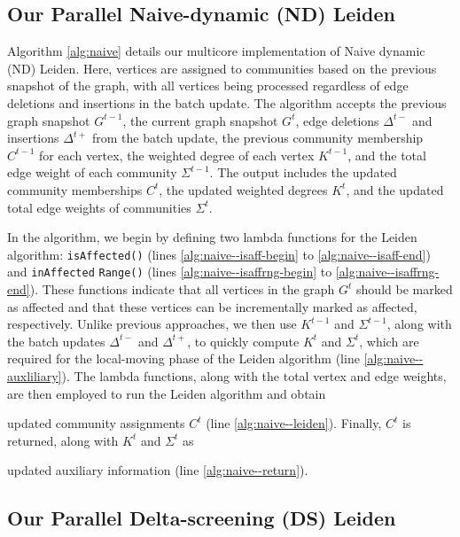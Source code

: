 \subsection{Our Parallel Naive-dynamic (ND) Leiden}
\label{sec:our-naive}

Algorithm \ref{alg:naive} details our multicore implementation of Naive dynamic (ND) Leiden. Here, vertices are assigned to communities based on the previous snapshot of the graph, with all vertices being processed regardless of edge deletions and insertions in the batch update. The algorithm accepts the previous graph snapshot $G^{t-1}$, the current graph snapshot $G^t$, edge deletions $\Delta^{t-}$ and insertions $\Delta^{t+}$ from the batch update, the previous community membership $C^{t-1}$ for each vertex, the weighted degree of each vertex $K^{t-1}$, and the total edge weight of each community $\Sigma^{t-1}$. The output includes the updated community memberships $C^t$, the updated weighted degrees $K^t$, and the updated total edge weights of communities $\Sigma^t$.

In the algorithm, we begin by defining two lambda functions for the Leiden algorithm: \texttt{isAffected()} (lines \ref{alg:naive--isaff-begin} to \ref{alg:naive--isaff-end}) and \texttt{inAffected} \texttt{Range()} (lines \ref{alg:naive--isaffrng-begin} to \ref{alg:naive--isaffrng-end}). These functions indicate that all vertices in the graph $G^t$ should be marked as affected and that these vertices can be incrementally marked as affected, respectively. Unlike previous approaches, we then use $K^{t-1}$ and $\Sigma^{t-1}$, along with the batch updates $\Delta^{t-}$ and $\Delta^{t+}$, to quickly compute $K^t$ and $\Sigma^t$, which are required for the local-moving phase of the Leiden algorithm (line \ref{alg:naive--auxliliary}). The lambda functions, along with the total vertex and edge weights, are then employed to run the Leiden algorithm and obtain updated community assignments $C^t$ (line \ref{alg:naive--leiden}). Finally, $C^t$ is returned, along with $K^t$ and $\Sigma^t$ as updated auxiliary information (line \ref{alg:naive--return}).




\subsection{Our Parallel Delta-screening (DS) Leiden}
\label{sec:our-delta}

